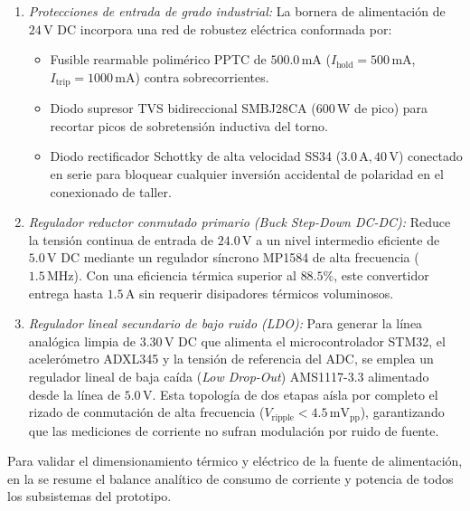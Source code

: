 \begin{enumerate}
    \item \textit{Protecciones de entrada de grado industrial:} La bornera de alimentación de $24\,\text{V DC}$ incorpora una red de robustez eléctrica conformada por:
    \begin{itemize}
        \item Fusible rearmable polimérico PPTC de $500.0\,\text{mA}$ ($I_{\text{hold}} = 500\,\text{mA}$, $I_{\text{trip}} = 1000\,\text{mA}$) contra sobrecorrientes.
        \item Diodo supresor TVS bidireccional SMBJ28CA ($600\,\text{W}$ de pico) para recortar picos de sobretensión inductiva del torno.
        \item Diodo rectificador Schottky de alta velocidad SS34 ($3.0\,\text{A}, 40\,\text{V}$) conectado en serie para bloquear cualquier inversión accidental de polaridad en el conexionado de taller.
    \end{itemize}

    \item \textit{Regulador reductor conmutado primario (Buck Step-Down DC-DC):} Reduce la tensión continua de entrada de $24.0\,\text{V}$ a un nivel intermedio eficiente de $5.0\,\text{V DC}$ mediante un regulador síncrono MP1584 de alta frecuencia ($1.5\,\text{MHz}$). Con una eficiencia térmica superior al $88.5\%$, este convertidor entrega hasta $1.5\,\text{A}$ sin requerir disipadores térmicos voluminosos.
    
    \item \textit{Regulador lineal secundario de bajo ruido (LDO):} Para generar la línea analógica limpia de $3.30\,\text{V DC}$ que alimenta el microcontrolador STM32, el acelerómetro ADXL345 y la tensión de referencia del ADC, se emplea un regulador lineal de baja caída (\textit{Low Drop-Out}) AMS1117-3.3 alimentado desde la línea de $5.0\,\text{V}$. Esta topología de dos etapas aísla por completo el rizado de conmutación de alta frecuencia ($V_{\text{ripple}} < 4.5\,\text{mV}_{\text{pp}}$), garantizando que las mediciones de corriente no sufran modulación por ruido de fuente.
\end{enumerate}

Para validar el dimensionamiento térmico y eléctrico de la fuente de alimentación, en la  se resume el balance analítico de consumo de corriente y potencia de todos los subsistemas del prototipo.


